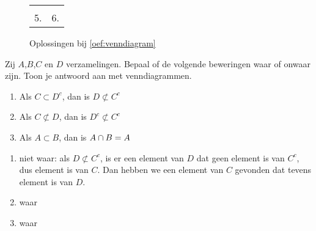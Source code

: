 \begin{oef}
\begin{opl}
\begin{figure}
{\begin{center}
\begin{tabular}{cc}
\begin{tikzpicture}
    \draw[outline] \ellA;
    \draw[outline] \ellB;
    \labels
  \end{tikzpicture}
  \\
  5.
  \begin{tikzpicture}
    \draw[thick,highlight] \universe;
    \draw[empty] \ellA;
    \draw[empty] \ellB;
    \draw[outline] \ellA;
    \labels
  \end{tikzpicture}
  &
  6.
  \begin{tikzpicture}
    \draw[thick,highlight] \universe;
    \draw[empty] \ellA;
    \draw[empty] \ellB;
    \draw[outline] \ellA;
    \labels
  \end{tikzpicture}
\end{tabular}
\end{center}
}
\caption{Oplossingen bij \cref{oef:venndiagram}} \label{fig:oef:venndiagram}
\end{figure}
\end{opl}
\end{oef}



\begin{oef}
Zij $A$,$B$,$C$ en $D$ verzamelingen. Bepaal of de volgende beweringen waar of onwaar zijn. Toon je antwoord aan met venndiagrammen.
\begin{enumerate}
  \item Als $C\subset D^c$, dan is $D \not \subset C^c$
  \item Als $C\not \subset D$, dan is $D^c \not \subset C^c$
  \item Als $A\subset B$, dan is $A\cap B =A$
\end{enumerate}
\begin{opl}
\begin{enumerate}
  \item niet waar: als $D \not \subset C^c$, is er  een element van $D$ dat geen element is van $C^c$, dus element is van $C$. Dan hebben we een element van $C$ gevonden dat tevens element is van $D$.
  \item waar
  \item waar
\end{enumerate}
\end{opl}
\end{oef}


